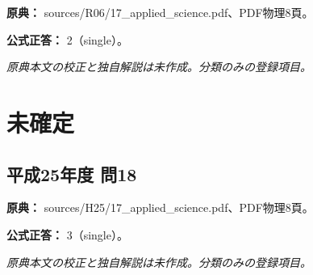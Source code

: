 \noindent\textbf{原典：} sources/R06/17\_applied\_science.pdf、PDF物理8頁。

\textbf{公式正答：} 2（single）。

\par\textit{原典本文の校正と独自解説は未作成。分類のみの登録項目。}

\section{未確定}

\subsection{平成25年度 問18}
\label{q:h25-reg-applied-18}

\noindent\textbf{原典：} sources/H25/17\_applied\_science.pdf、PDF物理8頁。

\textbf{公式正答：} 3（single）。

\par\textit{原典本文の校正と独自解説は未作成。分類のみの登録項目。}
